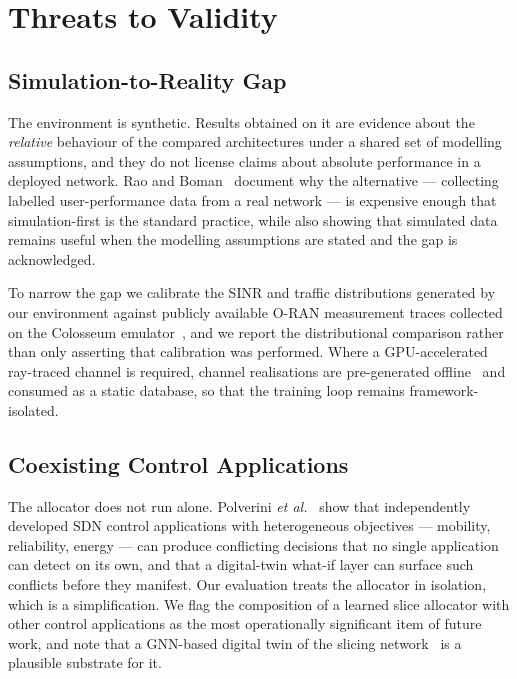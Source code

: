 \documentclass[journal]{IEEEtran}
\begin{document}
\section{Threats to Validity}\label{sec:validity}
 
\subsection{Simulation-to-Reality Gap}
The environment is synthetic. Results obtained on it are evidence about
the \emph{relative} behaviour of the compared architectures under a
shared set of modelling assumptions, and they do not license claims
about absolute performance in a deployed network. Rao and
Boman~\cite{rao2026ssl} document why the alternative --- collecting
labelled user-performance data from a real network --- is expensive
enough that simulation-first is the standard practice, while also
showing that simulated data remains useful when the modelling
assumptions are stated and the gap is acknowledged.
 
To narrow the gap we calibrate the SINR and traffic distributions
generated by our environment against publicly available O-RAN
measurement traces collected on the Colosseum
emulator~\cite{bonati2021colosseum,bonati2023openrangym}, and we report
the distributional comparison rather than only asserting that
calibration was performed. Where a GPU-accelerated ray-traced channel is
required, channel realisations are pre-generated
offline~\cite{hoydis2022sionna} and consumed as a static database, so
that the training loop remains framework-isolated.
 
\subsection{Coexisting Control Applications}
The allocator does not run alone. Polverini \emph{et
al.}~\cite{polverini2026sdnconflicts} show that independently developed
SDN control applications with heterogeneous objectives --- mobility,
reliability, energy --- can produce conflicting decisions that no
single application can detect on its own, and that a digital-twin
what-if layer can surface such conflicts before they manifest. Our
evaluation treats the allocator in isolation, which is a simplification.
We flag the composition of a learned slice allocator with other control
applications as the most operationally significant item of future work,
and note that a GNN-based digital twin of the slicing
network~\cite{wang2022gnndt} is a plausible substrate for it.
 
\end{document}
